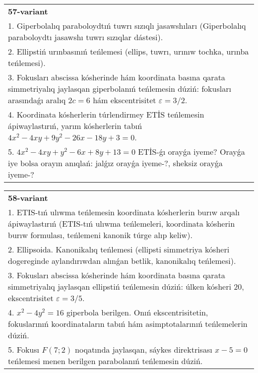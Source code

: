 \documentclass{article}
\begin{document}
\begin{tabular}{m{17cm}}
\textbf{57-variant}\\
1. Giperbolalıq paraboloydtıń tuwrı sızıqlı jasawshıları (Giperbolalıq paraboloydtı jasawshı tuwrı sızıqlar dástesi).\\

2. Ellipstiń urınbasınıń teńlemesi (ellips, tuwrı, urınıw tochka, urınba teńlemesi).\\

3. Fokusları abscissa kósherinde hám koordinata basına qarata simmetriyalıq jaylasqan giperbolanıń teńlemesin dúziń: fokusları arasındaǵı aralıq $2 c=6$ hám ekscentrisitet $\varepsilon=3/2$.\\

4. Koordinata kósherlerin túrlendirmey ETİS teńlemesin ápiwaylastırıń, yarım kósherlerin tabıń $4x^{2} - 4xy + 9y^{2} - 26x - 18y + 3 = 0$.\\

5. $4x^{2} - 4xy + y^{2} - 6x + 8y + 13 = 0$ ETİS-ǵı orayǵa iyeme? Orayǵa iye bolsa orayın anıqlań: jalǵız orayǵa iyeme-?, sheksiz orayǵa iyeme-?  
\end{tabular}
\vspace{1cm}


\begin{tabular}{m{17cm}}
\textbf{58-variant}\\
1. ETIS-tıń ulıwma teńlemesin koordinata kósherlerin burıw arqalı ápiwaylastırıń (ETIS-tıń ulıwma teńlemeleri, koordinata kósherin burıw formulası, teńlemeni kanonik túrge alıp keliw).\\

2. Ellipsoida. Kanonikalıq teńlemesi (ellipsti simmetriya kósheri dogereginde aylandırıwdan alınǵan betlik, kanonikalıq teńlemesi).\\

3. Fokusları abscissa kósherinde hám koordinata basına qarata simmetriyalıq jaylasqan ellipstiń teńlemesin dúziń: úlken kósheri $20$, ekscentrisitet $\varepsilon=3/5$.\\

4. $x^{2} - 4y^{2} = 16$ giperbola berilgen. Onıń ekscentrisitetin, fokuslarınıń koordinataların tabıń hám asimptotalarınıń teńlemelerin dúziń.\\

5. Fokusı $F(7;2)$ noqatında jaylasqan, sáykes direktrisası $x - 5 = 0$ teńlemesi menen berilgen parabolanıń teńlemesin dúziń.  
\end{tabular}
\vspace{1cm}
\end{document}
